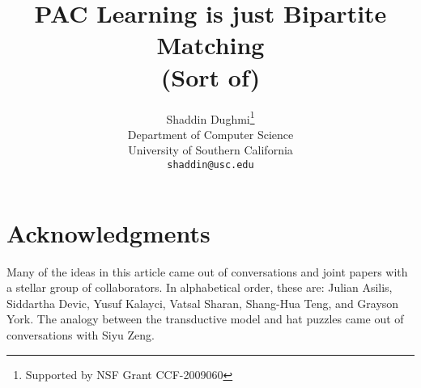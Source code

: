 \documentclass[11pt]{article}
\title{PAC Learning is just Bipartite Matching\\ (Sort of) %
}
\author{
  Shaddin Dughmi\thanks{Supported by NSF Grant CCF-2009060} \\
Department of Computer Science\\
University of Southern California\\
{\tt shaddin@usc.edu}
}
\begin{document}
\maketitle

%








\section*{Acknowledgments}
Many of the ideas in this article came out of conversations and joint papers  with a stellar group of collaborators. In alphabetical order, these are: Julian Asilis, Siddartha Devic, Yusuf Kalayci, Vatsal Sharan, Shang-Hua Teng, and Grayson York. The analogy between the transductive model and hat puzzles came out of conversations with Siyu Zeng.


{%

%
%
}
\end{document}
